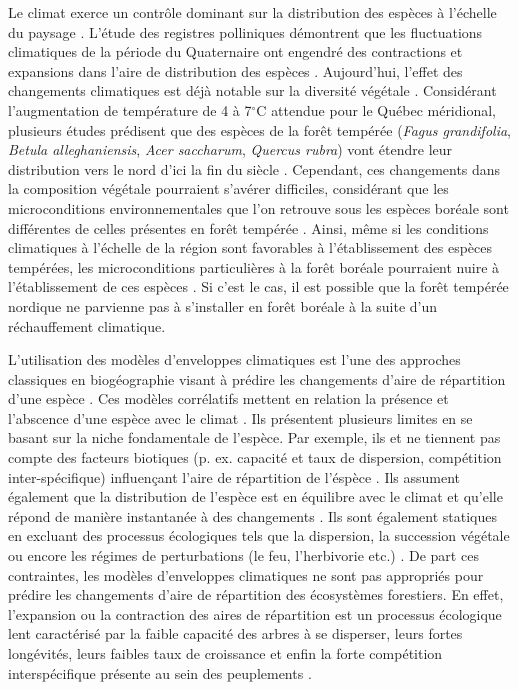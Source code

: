Le climat exerce un contrôle dominant sur la distribution des espèces à l'échelle du paysage
\citep{Pearson2003b}. L'étude des registres polliniques démontrent que les fluctuations climatiques
de la période du Quaternaire ont engendré des contractions et expansions dans l'aire de distribution
des espèces \citep{Davis2001}. Aujourd'hui, l'effet des changements climatiques est déjà notable sur
la diversité végétale \citep{Walther2002a,Parmesan2006}. Considérant l'augmentation de température
de 4 à 7$^\circ$C \citep[Scénario RCP 8.5]{Climatique2015} attendue pour le Québec méridional,
plusieurs études prédisent que des espèces de la forêt tempérée (\textit{Fagus grandifolia},
\textit{Betula alleghaniensis}, \textit{Acer saccharum}, \textit{Quercus rubra}) vont étendre leur
distribution vers le nord d'ici la fin du siècle \citep{Iverson2002,Sciences2014}. Cependant, ces
changements dans la composition végétale pourraient s'avérer difficiles, considérant que les
microconditions environnementales que l’on retrouve sous les espèces boréale sont différentes de
celles présentes en forêt tempérée \citep{Barras1998,Caspersen2005}. Ainsi, même si les conditions
climatiques à l'échelle de la région sont favorables à l'établissement des espèces tempérées, les
microconditions particulières à la forêt boréale pourraient nuire à l'établissement de ces espèces \citep{DeFrenne2013,Lafleur2010}. Si c’est le cas, il est possible que la forêt tempérée
nordique ne parvienne pas à s'installer en forêt boréale à la suite d’un réchauffement climatique.

L'utilisation des modèles d'enveloppes climatiques est l'une des approches classiques en
biogéographie visant à prédire les changements d'aire de répartition d'une espèce
\citep{Pearson2003b}. Ces modèles corrélatifs mettent en relation la présence et l'abscence d'une
espèce avec le climat \citep{Guisan2005a}. Ils présentent plusieurs limites en se basant sur la
niche fondamentale de l'espèce\citep{Guisan2005a}. Par exemple, ils et ne tiennent pas compte des
facteurs biotiques (p. ex. capacité et taux de dispersion, compétition inter-spécifique) influençant
l'aire de répartition de l'éspèce \citep{Guisan2005a,Pearson2003b}. Ils assument également que la
distribution de l'espèce est en équilibre avec le climat et qu'elle répond de manière instantanée à
des changements \citep{Austin2002}. Ils sont également statiques en excluant des processus
écologiques tels que la dispersion, la succession végétale ou encore les régimes de perturbations
(le feu, l'herbivorie etc.) \citep{Austin2002,Guisan2005a}. De part ces contraintes, les
modèles d'enveloppes climatiques ne sont pas appropriés pour prédire les changements d'aire de
répartition des écosystèmes forestiers. En effet, l'expansion ou la contraction des aires de
répartition est un processus écologique lent caractérisé par la faible capacité des arbres à se
disperser, leurs fortes longévités, leurs faibles taux de croissance et enfin la forte compétition
interspécifique présente au sein des peuplements \citep{Renwick2014,Vanderwel2014}.


